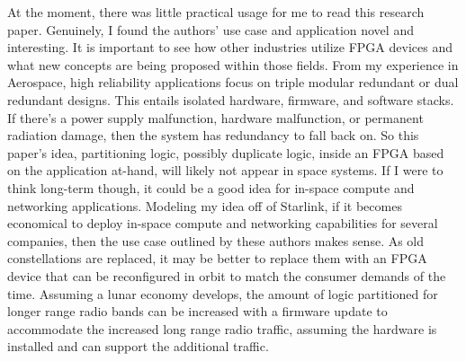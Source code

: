 \documentclass{article}
\begin{document}
At the moment, there was little practical usage for me to read this research paper.
Genuinely, I found the authors' use case and application novel and interesting.
It is important to see how other industries utilize FPGA devices and what new concepts are being proposed within those fields.
From my experience in Aerospace, high reliability applications focus on triple modular redundant or dual redundant designs.
This entails isolated hardware, firmware, and software stacks.
If there's a power supply malfunction, hardware malfunction, or permanent radiation damage, then the system has redundancy to fall back on.
So this paper's idea, partitioning logic, possibly duplicate logic, inside an FPGA based on the application at-hand, will likely not appear in space systems.
If I were to think long-term though, it could be a good idea for in-space compute and networking applications.
Modeling my idea off of Starlink, if it becomes economical to deploy in-space compute and networking capabilities for several companies, then the use case outlined by these authors makes sense.
As old constellations are replaced, it may be better to replace them with an FPGA device that can be reconfigured in orbit to match the consumer demands of the time. 
Assuming a lunar economy develops, the amount of logic partitioned for longer range radio bands can be increased with a firmware update to accommodate the increased long range radio traffic, assuming the hardware is installed and can support the additional traffic.

\nocite{*}



\end{document}
